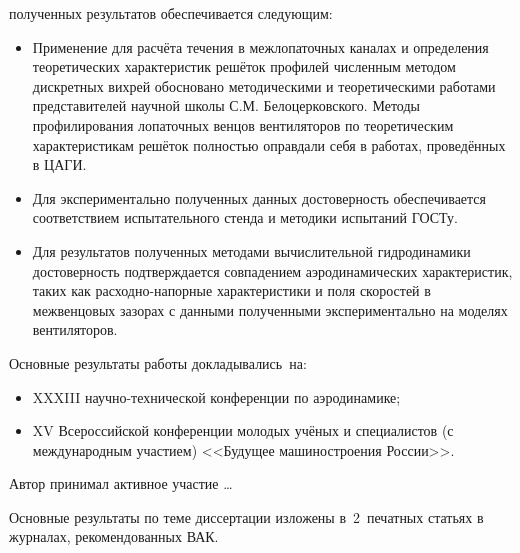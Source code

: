 {\reliability} полученных результатов обеспечивается следующим:
\begin{itemize}[beginpenalty=10000]
	\item
	Применение для расчёта течения в межлопаточных каналах и определения теоретических характеристик решёток профилей численным методом дискретных вихрей обосновано методическими и теоретическими работами представителей научной школы С.М. Белоцерковского. Методы профилирования лопаточных венцов вентиляторов по теоретическим характеристикам решёток полностью оправдали себя в работах, проведённых в ЦАГИ.
	\item 
	Для экспериментально полученных данных достоверность обеспечивается соответствием  испытательного стенда и методики испытаний ГОСТу.
	\item
	Для результатов полученных методами вычислительной гидродинамики достоверность подтверждается совпадением аэродинамических характеристик, таких как расходно-напорные характеристики и поля скоростей в межвенцовых зазорах с данными полученными экспериментально на моделях вентиляторов.
\end{itemize}

{\probation}
Основные результаты работы докладывались~на:
\begin{itemize}
	\item XXXIII научно-технической конференции по аэродинамике;
	\item XV Всероссийской конференции молодых учёных и специалистов (с международным участием) <<Будущее машиностроения России>>.
\end{itemize}

{\contribution} Автор принимал активное участие \ldots

{\publications} Основные результаты по теме диссертации изложены
в~2~печатных статьях в журналах, рекомендованных ВАК.

